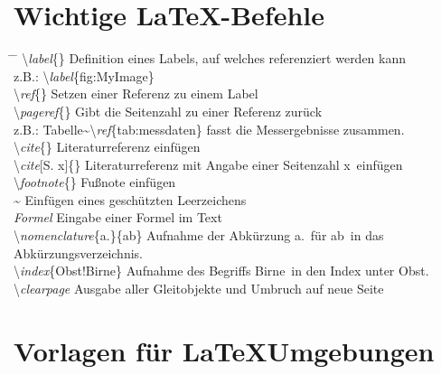 \setcounter{chapter}{5}
\setcounter{section}{0}
\setcounter{table}{0}
\setcounter{figure}{0}

\section{Wichtige \LaTeX -Befehle}

\begin{tabbing}
\hspace*{0cm} \= \hspace{0.25\linewidth} \= \+\kill
\textbackslash \textit{label}\{\}	\> Definition eines Labels, auf welches referenziert werden kann\\ 
	\> z.B.: \textbackslash \textit{label}\{fig:MyImage\}\\ 
\textbackslash \textit{ref}\{\}	\> Setzen einer Referenz zu einem Label\\
\textbackslash \textit{pageref}\{\}	\> Gibt die Seitenzahl zu einer Referenz zurück\\
	\> z.B.: Tabelle\~{}\textbackslash \textit{ref}\{tab:messdaten\} fasst die Messergebnisse zusammen.\\ 
\textbackslash \textit{cite}\{\}	\> Literaturreferenz einfügen\\
\textbackslash \textit{cite}[S. x]\{\}	\> Literaturreferenz mit Angabe einer Seitenzahl \glqq x\grqq~einfügen\\

\textbackslash \textit{footnote}\{\}	\> Fußnote einfügen\\ 
\~{}	\> Einfügen eines geschützten Leerzeichens\\ 
\textdollar \textit{Formel} \textdollar	\> Eingabe einer Formel im Text\\
\textbackslash \textit{nomenclature}\{a.\}\{ab\}	\> Aufnahme der Abkürzung \glqq a.\grqq~für \glqq ab\grqq~in das Abkürzungsverzeichnis.\\
\textbackslash \textit{index}\{Obst!Birne\} \> Aufnahme des Begriffs \glqq Birne\grqq~in den Index unter \glqq Obst\grqq.  \\
\textbackslash \textit{clearpage}	\> Ausgabe aller Gleitobjekte und Umbruch auf neue Seite\\ 
\end{tabbing}

\clearpage

\section{Vorlagen für \LaTeX Umgebungen}

